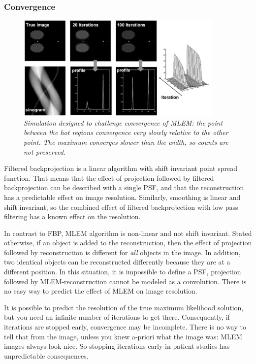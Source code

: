 \documentclass[11pt,oneside]{article}
\begin{document}
\subsubsection{Convergence} \label{sec:mlemconverge}
\begin{figure}[tb]
\centering
\includegraphics[width=0.9\textwidth]{figs/fig_mlem_converge.pdf}
\caption{\label{fig:mlem_converge} \emph{Simulation designed to challenge
convergence of MLEM: the point between the hot regions convergence very slowly
relative to the other point. The maximum converges slower than the width, so
counts are not preserved.}}
\end{figure}
%
Filtered backprojection is a linear algorithm with shift invariant point
spread function. That means that the effect of projection followed by filtered
backprojection can be described with a single PSF, and that the reconstruction
has a predictable effect on image resolution. Similarly, smoothing is linear
and shift invariant, so the combined effect of filtered backprojection with
low pass filtering has a known effect on the resolution.

In contrast to FBP, MLEM algorithm is non-linear and not shift invariant.
Stated otherwise, if an object is added to the reconstruction, then the effect
of projection followed by reconstruction is different for {\em all} objects in
the image. In addition, two identical objects can be reconstructed differently
because they are at a different position. In this situation, it is impossible
to define a PSF, projection followed by MLEM-reconstruction cannot be modeled
as a convolution. There is no easy way to predict the effect of MLEM on image
resolution. 

It is possible to predict the resolution of the true maximum likelihood
solution, but you need an infinite number of iterations to get
there. Consequently, if iterations are stopped early, convergence may be
incomplete. There is no way to tell that from the image, unless you knew
a-priori what the image was: MLEM images always look nice. So stopping
iterations early in patient studies has unpredictable consequences.
\end{document}

